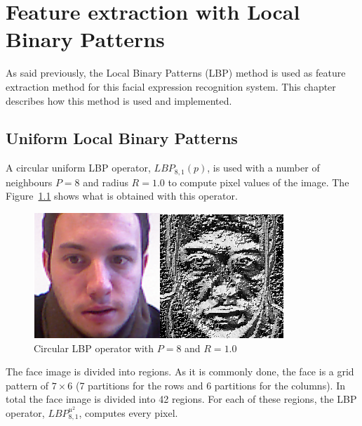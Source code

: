 \chapter{Feature extraction with Local Binary Patterns}
\label{chap:implementation_lbp}

\noindent As said previously, the Local Binary Patterns (LBP) method is used as feature extraction method for this facial expression recognition system. This chapter describes how this method is used and implemented.
\newline

\section{Uniform Local Binary Patterns}

\vspace{\baselineskip}
\noindent A circular uniform LBP operator, $ LBP_{8,1}(p) $, is used with a number of neighbours $ P = 8 $ and radius $ R = 1.0 $ to compute pixel values of the image. The Figure~\ref{lbp_implementation_example} shows what is obtained with this operator. 
\newline

\begin{figure}[!h]
\begin{center}
\noindent \includegraphics[scale=0.7]{figures/lbp_implementation_example} 
\newline
\caption{Circular LBP operator with $ P = 8 $ and $ R = 1.0 $}
\label{lbp_implementation_example}
\end{center} 
\end{figure}

\noindent The face image is divided into regions. As it is commonly done, the face is a grid pattern of $ 7\times6 $ (7 partitions for the rows and 6 partitions for the columns). In total the face image is divided into 42 regions. For each of these regions, the LBP operator, $ LBP_{8,1}^{u^2} $, computes every pixel.
\newline

